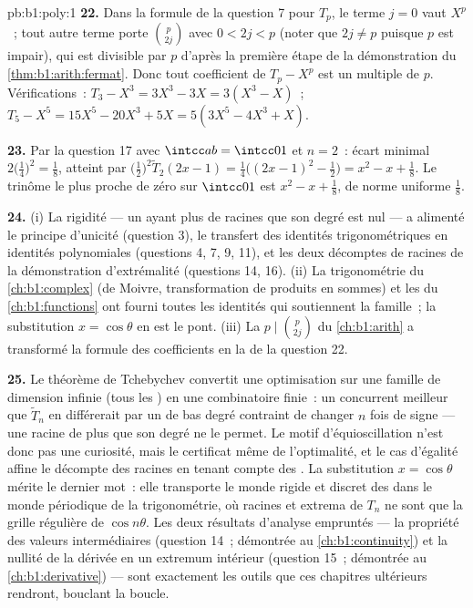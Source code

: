 \begin{solution}{pb:b1:poly:1}
\textbf{22.} Dans la formule de la question 7 pour $T_p$, le terme
$j = 0$ vaut $X^p$~; tout autre terme porte $\binom p{2j}$ avec $0 <
2j < p$ (noter que $2j \neq p$ puisque $p$ est impair), qui est
divisible par $p$ d'après la première étape de la démonstration du
\cref{thm:b1:arith:fermat}. Donc tout coefficient de $T_p - X^p$ est
un multiple de $p$. Vérifications~: $T_3 - X^3 = 3X^3 - 3X = 3(X^3 -
X)$~; $T_5 - X^5 = 15X^5 - 20X^3 + 5X = 5(3X^5 - 4X^3 + X)$.

\textbf{23.} Par la question 17 avec $\intcc ab = \intcc01$ et $n =
2$~: écart minimal $2\bigl(\frac14\bigr)^2 = \frac18$, atteint par
$\bigl(\frac12\bigr)^2\widetilde T_2(2x - 1) =
\frac14\bigl((2x-1)^2 - \frac12\bigr) = x^2 - x + \frac18$. Le
trinôme  le plus proche de zéro sur $\intcc01$ est $x^2 - x
+ \frac18$, de norme uniforme $\frac18$.

\textbf{24.} (i) La rigidité --- un  ayant plus de racines
que son degré est nul --- a alimenté le principe d'unicité
(question 3), le transfert des identités trigonométriques en
identités polynomiales (questions 4, 7, 9, 11), et les deux
décomptes de racines de la démonstration d'extrémalité (questions
14, 16). (ii) La trigonométrie du \cref{ch:b1:complex} (de Moivre,
transformation de produits en sommes) et les 
du \cref{ch:b1:functions} ont fourni toutes les identités qui
soutiennent la famille~; la substitution $x = \cos\theta$ en est le
pont. (iii) La  $p \mid \binom p{2j}$ du
\cref{ch:b1:arith} a transformé la formule des coefficients en la
 de la question 22.

\textbf{25.} Le théorème de Tchebychev convertit une optimisation
sur une famille de dimension infinie (tous les )
en une combinatoire finie~: un concurrent meilleur que $\widetilde
T_n$ en différerait par un  de bas degré contraint de
changer $n$ fois de signe --- une racine de plus que son degré ne le
permet. Le motif d'équioscillation n'est donc pas une curiosité,
mais le certificat même de l'optimalité, et le cas d'égalité affine
le décompte des racines en tenant compte des . La
substitution $x = \cos\theta$ mérite le dernier mot~: elle
transporte le monde rigide et discret des  dans le monde
périodique de la trigonométrie, où racines et extrema de $T_n$ ne
sont que la grille régulière de $\cos n\theta$. Les deux résultats
d'analyse empruntés --- la propriété des valeurs intermédiaires
(question 14~; démontrée au \cref{ch:b1:continuity}) et la nullité
de la dérivée en un extremum intérieur (question 15~; démontrée au
\cref{ch:b1:derivative}) --- sont exactement les outils que ces
chapitres ultérieurs rendront, bouclant la boucle.
\end{solution}
